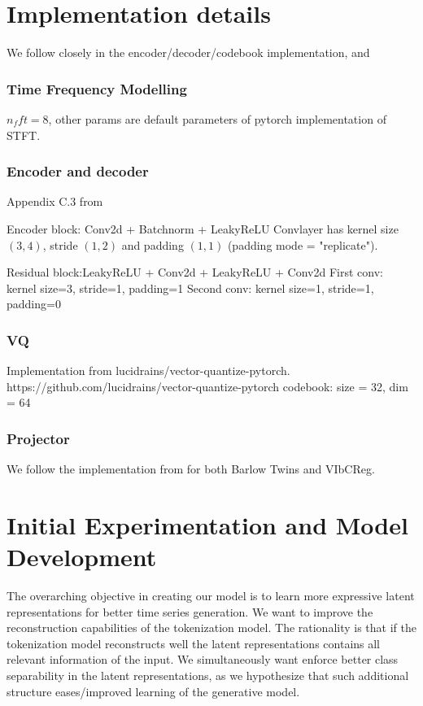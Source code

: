 \documentclass[../../thesis.tex]{subfiles}
\begin{document}
\section{Implementation details}
We follow \cite{TimeVQVAE} closely in the encoder/decoder/codebook implementation, and 

\subsubsection{Time Frequency Modelling}
$n_fft = 8$, other params are default parameters of pytorch implementation of STFT. 

\subsubsection{Encoder and decoder}
Appendix C.3 from \cite{TimeVQVAE}\newline

Encoder block: Conv2d + Batchnorm + LeakyReLU \newline
Convlayer has kernel size $(3,4)$, stride $(1,2)$ and padding $(1,1)$ (padding mode = "replicate"). \newline

Residual block:LeakyReLU + Conv2d + LeakyReLU + Conv2d\newline
First conv: kernel size=3, stride=1, padding=1\newline
Second conv: kernel size=1, stride=1, padding=0\newline


\subsubsection{VQ}
Implementation from lucidrains/vector-quantize-pytorch.
https://github.com/lucidrains/vector-quantize-pytorch \newline
codebook: size = 32, dim = 64 

\subsubsection{Projector}
We follow the implementation from \cite{lee2024computer} for both Barlow Twins and VIbCReg.

\section{Initial Experimentation and Model Development}

The overarching objective in creating our model is to learn more expressive latent representations for better time series generation. We want to improve the reconstruction capabilities of the tokenization model. The rationality is that if the tokenization model reconstructs well the latent representations contains all relevant information of the input. We simultaneously want enforce better class separability in the latent representations, as we hypothesize that such additional structure eases/improved learning of the generative model.\newline
\end{document}
